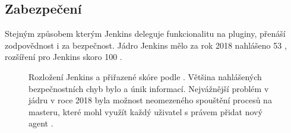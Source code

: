         \blind[1]
        \blind[1]

    \subsection{Zabezpečení}
        Stejným způsobem kterým Jenkins deleguje funkcionalitu na pluginy, přenáší zodpovědnost i za bezpečnost. Jádro Jenkins mělo za rok 2018 nahlášeno 53 , rozšíření pro Jenkins skoro 100 \cite{cve-jenkins}.
        \blind[3]

        \begin{figure}[hbt]
            \centering
            \caption{Rozložení Jenkins  a přiřazené skóre podle . Většina nahlášených bezpečnostních chyb bylo  a únik informací. Nejvážnější problém v jádru v roce 2018 byla možnost neomezeného spouštění procesů na masteru, které mohl využít každý uživatel s právem přidat nový agent \cite{cve-jenkins}.}
            \label{fig:gitlab-review-cycle}
        \end{figure}

